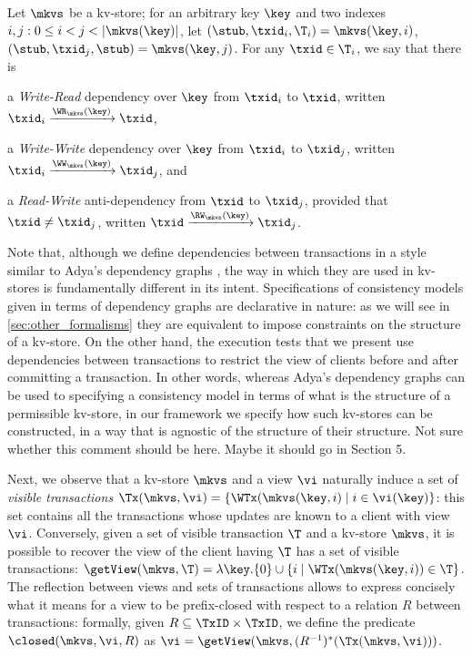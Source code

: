 Let $\mkvs$ be a kv-store; for an arbitrary key $\key$ and 
two indexes $i,j: 0 \leq i < j < \lvert \mkvs(\key) \rvert$, let 
$(\stub, \txid_{i}, \T_{i}) = \mkvs(\key, i)$, $(\stub, \txid_{j}, \stub) = \mkvs(\key,j)$. 
For any $\txid \in \T_{i}$, we say that there is 
\begin{enumerate*} 
\item a \emph{Write-Read} dependency over 
$\key$ from $\txid_{i}$ to $\txid$, written $\txid_{i} \xrightarrow{\WR_{\mkvs}(\key)} \txid$, 
\item a \emph{Write-Write} dependency over $\key$ from $\txid_{i}$ to $\txid_{j}$, 
written $\txid_{i} \xrightarrow{\WW_{\mkvs}(\key)} \txid_{j}$, and 
\item a \emph{Read-Write} anti-dependency from $\txid$ to $\txid_{j}$, provided that 
$\txid \neq \txid_{j}$, written $\txid \xrightarrow{\RW_{\mkvs}(\key)} \txid_{j}$.
\end{enumerate*}

Note that, although we define dependencies between transactions in a style 
similar to Adya's dependency graphs \cite{adya}, the way in which they are used 
in kv-stores is fundamentally different in its intent. Specifications of consistency 
models given in terms of dependency graphs are declarative in nature: as 
we will see in \cref{sec:other_formalisms} they are equivalent to impose 
constraints on the structure of a kv-store. On the other hand, the execution 
tests that we present use dependencies between transactions to restrict 
the view of clients before and after committing a transaction. In other words, 
whereas Adya's dependency graphs can be used to specifying a consistency model 
in terms of what is the structure of a permissible kv-store, in our framework we 
specify how such kv-stores can be constructed, in a way that is agnostic 
of the structure of their structure.
\ac{Not sure whether this comment should be here. Maybe it should go in Section 5.}

Next, we observe that a kv-store $\mkvs$ and a view $\vi$ naturally induce a 
set of \emph{visible transactions} $\Tx(\mkvs, \vi) = \{\WTx(\mkvs(\key, i) \mid i \in \vi(\key)\}$: this 
set contains all the transactions whose updates are known to a client with view $\vi$. 
Conversely, given a set of visible transaction $\T$ and a kv-store $\mkvs$, it is 
possible to recover the view of the client having $\T$ has a set of visible transactions: 
$\getView(\mkvs, \T) = \lambda \key. \{0\} \cup \{i \mid \WTx(\mkvs(\key, i)) \in \T\}$. 
The reflection between views and sets of transactions allows to express concisely 
what it means for a view to be prefix-closed with respect to a relation $R$ between 
transactions: formally, given $R \subseteq \TxID \times \TxID$, we define the predicate  
$\closed(\mkvs, \vi, R)$ as $\vi = \getView(\mkvs, (R^{-1})^{\ast}(\Tx(\mkvs, \vi)))$.

